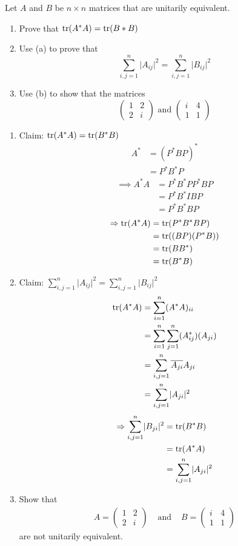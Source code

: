 Let $A$ and $B$ be $n \times n$ matrices that are unitarily
equivalent.
\begin{enumerate}
\item Prove that $\text{tr}({A^*A}) = \text{tr}({B*B})$
\item Use (a) to prove that
\[
\sum\limits_{i,j=1}^n\lvert A_{ij}\rvert^2 = \sum\limits_{i,j=1}^n\lvert B_{ij}\rvert^2 
\]
\item Use (b) to show that the matrices
\[
\begin{pmatrix}
1 & 2\\
2 & i
\end{pmatrix}
\text{ and }
\begin{pmatrix}
i & 4\\
1 & 1
\end{pmatrix}
\]
\end{enumerate}
\begin{enumerate}
\item Claim: $\text{tr}({A^*A}) = \text{tr}({B^*B})$
\begin{align}
A^* &= (P^*BP)^*\\
&= P^*B^*P
\end{align}
\begin{align}
\implies A^*A &= P^*B^*PP^*BP\\
&= P^*B^*IBP\\
&=P^*B^*BP
\end{align}
\begin{align}
\Rightarrow \text{tr}({A^*A}) &= \text{tr}({P^*B^*BP})\\
&=\text{tr}({(BP)(P^*B)})\\
&=\text{tr}({BB^*})\\
&=\text{tr}({B^*B})
\end{align}
\item Claim: $\sum\limits_{i,j=1}^n\lvert A_{ij}\rvert^2 =
  \sum\limits_{i,j=1}^n\lvert B_{ij}\rvert^2 $
\begin{align}
\text{tr}({A^*A}) &= \sum\limits_{i=1}^n(A^*A)_{ii}\\
&= \sum\limits_{i=1}^n\sum\limits_{j=1}^n(A^*_{ij})(A_{ji})\\
&=\sum\limits_{i,j=1}^n \overline{A_{ji}}A_{ji}\\
&=\sum\limits_{i,j=1}^n\lvert A_{ji}\rvert^2
\end{align}
\begin{align}
\Rightarrow \sum\limits_{i,j=1}^n\lvert B_{ji}\rvert^2  &= \text{tr}({B^*B})\\
&=\text{tr}({A^*A})\\
&=\sum\limits_{i,j=1}^n\lvert A_{ji}\rvert^2 
\end{align}
\item Show that \begin{align}
A= \begin{pmatrix}
1 & 2 \\
2 & i
\end{pmatrix}
&\text{ and } & 
B = \begin{pmatrix}
i & 4\\
1 & 1
\end{pmatrix}
\end{align}
are not unitarily equivalent.


\end{enumerate}
